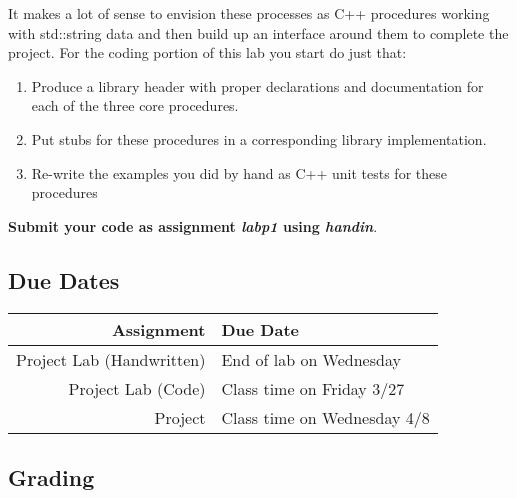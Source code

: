 \documentclass[]{tufte-handout}
\begin{document}
It makes a lot of sense to envision these processes as C++ procedures working with std::string data and then build up an interface around them to complete the project. For the coding portion of this lab you start do just that: 
\begin{enumerate}
\item Produce a library header with proper declarations and documentation for each of the three core procedures.
\item Put stubs for these procedures in a corresponding library implementation.
\item Re-write the examples you did by hand as C++ unit tests for these procedures 
\end{enumerate}
\textbf{Submit your code as assignment \textit{labp1} using \textit{handin}}.

\subsection{Due Dates}

\begin{center}
\begin{tabular}{rl}
Assignment & Due Date \\ \hline
Project Lab (Handwritten) & End of lab on Wednesday \\
Project Lab (Code) & Class time on Friday 3/27 \\
Project & Class time on Wednesday 4/8
\end{tabular}
\end{center}


\subsection{Grading}
\end{document}
